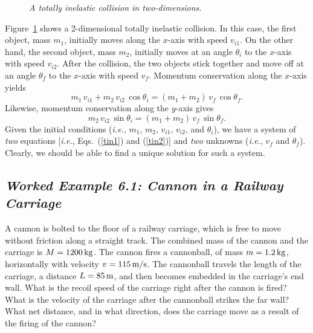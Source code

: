 \begin{figure}
\epsfysize=2.5in
\centerline{}
\caption{\em A totally inelastic collision in two-dimensions.}\label{f57}  
\end{figure}

Figure~\ref{f57} shows a 2-dimensional totally inelastic collision. In this
case, the first object, mass $m_1$, initially moves along the $x$-axis
with speed $v_{i1}$. On the other hand, the second object, mass $m_2$, initially moves at an
angle $\theta_i$ to the $x$-axis with speed $v_{i2}$. After the collision, the two
objects stick together and move off at an angle $\theta_f$ to the $x$-axis with
speed $v_f$. Momentum conservation along the $x$-axis yields
\begin{equation}\label{tin1}
m_1\,v_{i1} + m_2\,v_{i2}\,\cos\theta_i = (m_1+m_2)\,v_f\,\cos\theta_f.
\end{equation}
Likewise, momentum conservation along the $y$-axis gives
\begin{equation}\label{tin2}
 m_2\,v_{i2}\,\sin\theta_i = (m_1+m_2)\,v_f\,\sin\theta_f.
\end{equation}
Given the initial conditions ({\em i.e.}, $m_1$, $m_2$, $v_{i1}$, $v_{i2}$, and
$\theta_i$), we have a system of {\em two} equations [{\em i.e.}, Eqs.~(\ref{tin1}) and
(\ref{tin2})]  and {\em two} unknowns ({\em i.e.}, $v_f$ and $\theta_f$). 
Clearly, we should be able to find a unique solution for such a system. 

\subsection*{\em Worked Example 6.1: Cannon in a Railway Carriage}
 A cannon is bolted to the floor of a railway carriage, which is
free to move without friction along a straight track. The combined mass of the cannon and
the carriage is $M=1200\,{\rm kg}$. The cannon fires a cannonball, of mass $m=1.2\,{\rm kg}$,
horizontally with velocity $v=115\,{\rm m/s}$. The cannonball travels the length of the
carriage, a distance $L=85\,{\rm m}$,  and then becomes embedded in the carriage's end wall. What is the recoil
speed of the carriage right after the cannon is fired? What is the velocity of the
carriage after the cannonball strikes the far wall? What net distance, and in what
direction, does the carriage move as a result of the firing of the cannon?

\begin{figure*}[h]
\epsfysize=1in
\centerline{}
\end{figure*}


